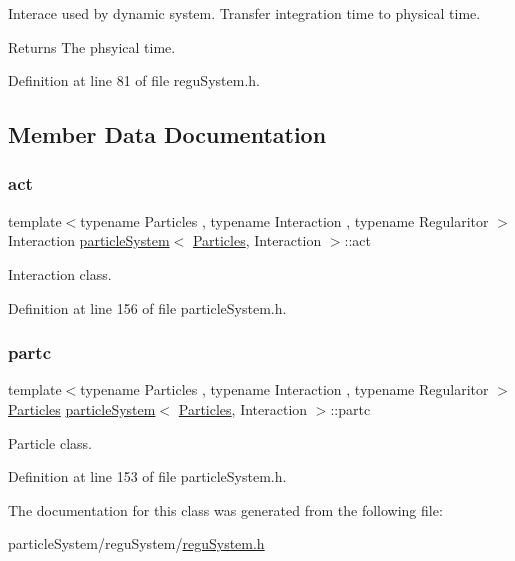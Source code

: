 Interace used by dynamic system. Transfer integration time to physical time. \begin{DoxyReturn}{Returns}
The phsyical time. 
\end{DoxyReturn}


Definition at line 81 of file regu\+System.\+h.



\subsection{Member Data Documentation}
\mbox{\label{class_regu_system_a41e5c73bc46164302db25b5c5d28aedd}} 
\subsubsection{\texorpdfstring{act}{act}}
{\footnotesize\ttfamily template$<$typename Particles , typename Interaction , typename Regularitor $>$ \\
Interaction \mbox{\hyperlink{classparticle_system}{particle\+System}}$<$ \mbox{\hyperlink{struct_particles}{Particles}}, Interaction $>$\+::act}



Interaction class. 



Definition at line 156 of file particle\+System.\+h.

\mbox{\label{class_regu_system_a48cb24fbd9d72503a5e464a02760e814}} 
\subsubsection{\texorpdfstring{partc}{partc}}
{\footnotesize\ttfamily template$<$typename Particles , typename Interaction , typename Regularitor $>$ \\
\mbox{\hyperlink{struct_particles}{Particles}} \mbox{\hyperlink{classparticle_system}{particle\+System}}$<$ \mbox{\hyperlink{struct_particles}{Particles}}, Interaction $>$\+::partc}



Particle class. 



Definition at line 153 of file particle\+System.\+h.



The documentation for this class was generated from the following file\+:\begin{DoxyCompactItemize}
\item 
particle\+System/regu\+System/\mbox{\hyperlink{regu_system_8h}{regu\+System.\+h}}\end{DoxyCompactItemize}
